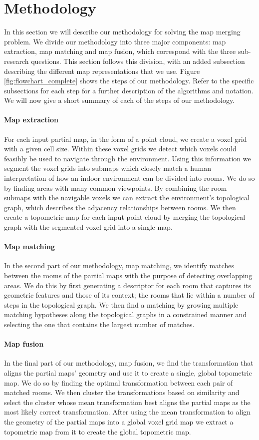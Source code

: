 \section{Methodology}
In this section we will describe our methodology for solving the map merging problem. We divide our methodology into three major components: map extraction, map matching and map fusion, which correspond with the three sub-research questions. This section follows this division, with an added subsection describing the different map representations that we use. Figure \ref{fig:flowchart_complete} shows the steps of our methodology. Refer to the specific subsections for each step for a further description of the algorithms and notation. We will now give a short summary of each of the steps of our methodology.

\paragraph{Map extraction}
For each input partial map, in the form of a point cloud, we create a voxel grid with a given cell size. Within these voxel grids we detect which voxels could feasibly be used to navigate through the environment. Using this information we segment the voxel grids into submaps which closely match a human interpretation of how an indoor environment can be divided into rooms. We do so by finding areas with many common viewpoints. By combining the room submaps with the navigable voxels we can extract the environment's topological graph, which describes the adjacency relationships between rooms. We then create a topometric map for each input point cloud by merging the topological graph with the segmented voxel grid into a single map.

\paragraph{Map matching}
In the second part of our methodology, map matching, we identify matches between the rooms of the partial maps with the purpose of detecting overlapping areas. We do this by first generating a descriptor for each room that captures its geometric features and those of its context; the rooms that lie within a number of steps in the topological graph. We then find a matching by growing multiple matching hypotheses along the topological graphs in a constrained manner and selecting the one that contains the largest number of matches.

\paragraph{Map fusion}
In the final part of our methodology, map fusion, we find the transformation that aligns the partial maps' geometry and use it to create a single, global topometric map. We do so by finding the optimal transformation between each pair of matched rooms. We then cluster the transformations based on similarity and select the cluster whose mean transformation best aligns the partial maps as the most likely correct transformation. After using the mean transformation to align the geometry of the partial maps into a global voxel grid map we extract a topometric map from it to create the global topometric map.

